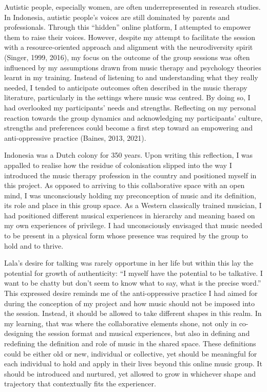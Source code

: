 \documentclass[authordate, empirical, issue]{jote-new-article}
\begin{document}
Autistic people, especially women, are often underrepresented in research studies. In Indonesia, autistic people's voices are still dominated by parents and professionals. Through this “hidden” online platform, I attempted to empower them to raise their voices. However, despite my attempt to facilitate the session with a resource-oriented approach and alignment with the neurodiversity spirit (Singer, 1999, 2016), my focus on the outcome of the group sessions was often influenced by my assumptions drawn from music therapy and psychology theories learnt in my training. Instead of listening to and understanding what they really needed, I tended to anticipate outcomes often described in the music therapy literature, particularly in the settings where music was centred. By doing so, I had overlooked my participants' needs and strengths. Reflecting on my personal reaction towards the group dynamics and acknowledging my participants' culture, strengths and preferences could become a first step toward an empowering and anti-oppressive practice (Baines, 2013, 2021).



Indonesia was a Dutch colony for 350 years. Upon writing this reflection, I was appalled to realise how the residue of colonisation slipped into the way I introduced the music therapy profession in the country and positioned myself in this project. As opposed to arriving to this collaborative space with an open mind, I was unconsciously holding my preconception of music and its definition, its role and place in this group space. As a Western classically trained musician, I had positioned different musical experiences in hierarchy and meaning based on my own experiences of privilege. I had unconsciously envisaged that music needed to be present in a physical form whose presence was required by the group to hold and to thrive.



Lala's desire for talking was rarely opportune in her life but within this lay the potential for growth of authenticity: “I myself have the potential to be talkative. I want to be chatty but don't seem to know what to say, what is the precise word.” This expressed desire reminds me of the anti-oppressive practice I had aimed for during the conception of my project and how music should not be imposed into the session. Instead, it should be allowed to take different shapes in this realm. In my learning, that was where the collaborative elements shone, not only in co-designing the session format and musical experiences, but also in defining and redefining the definition and role of music in the shared space. These definitions could be either old or new, individual or collective, yet should be meaningful for each individual to hold and apply in their lives beyond this online music group. It should be introduced and nurtured, yet allowed to grow in whichever shape and trajectory that contextually fits the experiencer.
\end{document}
